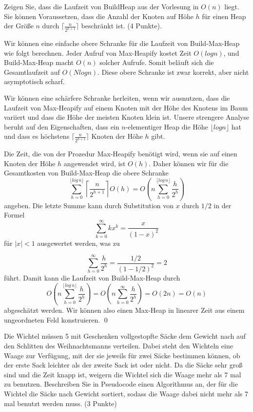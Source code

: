 \documentclass[ngerman,landscape,twocolumn]{adtexsheet}
\begin{document}
\begin{question}
Zeigen Sie, dass die Laufzeit von BuildHeap aus der Vorlesung in $O(n)$ liegt. Sie können Voraussetzen, dass die Anzahl der Knoten auf Höhe $h$ für einen Heap der Größe $n$ durch $\lceil \frac{n}{2^{h+1}} \rceil$ beschränkt ist. (4 Punkte).
\end{question}

Wir können eine einfache obere Schranke für die Laufzeit von Build-Max-Heap wie folgt berechnen. Jeder Aufruf von Max-Heapify kostet Zeit $O(log n)$, und Build-Max-Heap macht $O(n)$ solcher Aufrufe. Somit beläuft sich die Gesamtlaufzeit auf $O(N log n)$. Diese obere Schranke ist zwar korrekt, aber nicht asymptotisch scharf.

Wir können eine schärfere Schranke herleiten, wenn wir ausnutzen, dass die Laufzeit von Max-Heapify auf einem Knoten mit der Höhe des Knotens im Baum variiert und dass die Höhe der meisten Knoten klein ist. Unsere strengere Analyse beruht auf den Eigenschaften, dass ein $n$-elementiger Heap die Höhe $\lfloor log n \rfloor$ hat und dass es höchstens $\lceil \frac{n}{2^{h+1}} \rceil$ Knoten der Höhe $h$ gibt.

Die Zeit, die von der Prozedur Max-Heapify benötigt wird, wenn sie auf einen Knoten der Höhe $h$ angewendet wird, ist $O(h)$. Daher können wir für die Gesamtkosten von Build-Max-Heap die obere Schranke
\[
\sum_{h=0}^{\lfloor log\,n \rfloor} \left\lceil \frac{n}{2^{h+1}} \right\rceil O(h) = O\left( n \sum_{h=0}^{\lfloor log\,n \rfloor} \frac{h}{2^h} \right)
\]
angeben. Die letzte Summe kann durch Substitution von $x$ durch $1/2$ in der Formel
\[
\sum_{k=0}^{\infty} kx^k= \frac{x}{(1-x)^2}
\]
für $|x| < 1$ ausgewertet werden, was zu

\[
\sum_{h=0}^{\infty} \frac{h}{2^h} = \frac{1/2}{(1-1/2)^2} = 2
\]
führt. Damit kann die Laufzeit von Build-Max-Heap durch
\[
O \left( n \sum_{h=0}^{\lfloor log\,n \rfloor} \frac{h}{2^h}  \right) = O \left( n \sum_{h=0}^{\infty} \frac{h}{2^h}  \right) = O(2n) = O(n)
\]
abgeschätzt werden. Wir können also einen Max-Heap in linearer Zeit aus einem ungeordneten Feld konstruieren. \qed
\begin{question}
Die Wichtel müssen 5 mit Geschenken vollgestopfte Säcke dem Gewicht nach auf den
Schlitten des Weihnachtsmanns verteilen. Dabei steht den Wichteln eine Waage zur
Verfügung, mit der sie jeweils für zwei Säcke bestimmen können, ob der erste Sack leichter
als der zweite Sack ist oder nicht. Da die Säcke sehr groß sind und die Zeit knapp ist,
weigern die Wichtel sich die Waage mehr als 7 mal zu benutzen. Beschreiben Sie in
Pseudocode einen Algorithmus an, der für die Wichtel die Säcke nach Gewicht sortiert,
sodass die Waage dabei nicht mehr als 7 mal benutzt werden muss. (3 Punkte)\\
\end{question}
\end{document}
